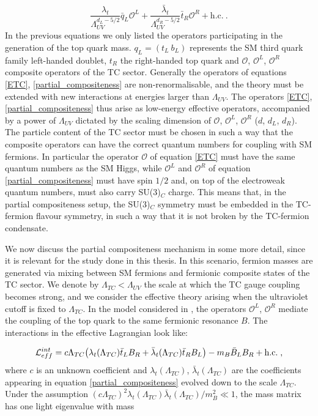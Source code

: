 \begin{equation}
\frac{\lambda_t}{\Lambda_{UV}^{d_L - 5/2}} \bar q_L \mathcal O^L + \frac{\bar \lambda_t}{\Lambda_{UV}^{d_R - 5/2}} \bar t_R  \mathcal O^R + \mathrm{h.c.} \: .
\label{partial_compositeness}
\end{equation}
%
In the previous equations we only listed the operators participating in the generation of the top quark mass. $q_L = (t_L \: b_L)$ represents the SM third quark family left-handed doublet, $t_R$ the right-handed top quark and $\mathcal O$, $\mathcal O^L$, $\mathcal O^R$ composite operators of the TC sector. Generally the operators of equations \ref{ETC}, \ref{partial_compositeness} are non-renormalisable, and the theory must be extended with new interactions at energies larger than $\Lambda_{UV}$. The operators \ref{ETC}, \ref{partial_compositeness} thus arise as low-energy effective operators, accompanied by a power of $\Lambda_{UV}$ dictated by the scaling dimension of $\mathcal O$, $\mathcal O^L$, $\mathcal O^R$ ($d$, $d_L$, $d_R$). The particle content of the TC sector must be chosen in such a way that the composite operators can have the correct quantum numbers for coupling with SM fermions. In particular the operator $\mathcal O$ of equation \ref{ETC} must have the same quantum numbers as the SM Higgs, while $\mathcal O^L$ and $\mathcal O^R$ of equation \ref{partial_compositeness} must have spin $1/2$ and, on top of the electroweak quantum numbers, must also carry SU(3)$_C$ charge. This means that, in the partial compositeness setup, the SU(3)$_C$ symmetry must be embedded in the TC-fermion flavour symmetry, in such a way that it is not broken by the TC-fermion condensate.

We now discuss the partial compositeness mechanism in some more detail, since it is relevant for the study done in this thesis. In this scenario, fermion masses are generated via mixing between SM fermions and fermionic composite states of the TC sector. We denote by $\Lambda_{TC} < \Lambda_{UV} $ the scale at which the TC gauge coupling becomes strong, and we consider the effective theory arising when the ultraviolet cutoff is fixed to $\Lambda_{TC}$. In the model considered in \cite{Kaplan:1991dc}, the operators $\mathcal O^L$, $\mathcal O^R$ mediate the coupling of the top quark to the same fermionic resonance $B$. The interactions in the effective Lagrangian look like:

\begin{equation}
\mathcal L_{eff}^{int} = c \Lambda_{TC}  \bigl( \lambda_t(\Lambda_{TC}) \bar t_L B_R + \bar \lambda_t(\Lambda_{TC}) \bar t_R B_L \bigr) - m_B \bar B_L B_R + \mathrm{h.c.} \; ,
\end{equation}
%
where $c$ is an unknown coefficient and $\lambda_t(\Lambda_{TC})$, $\bar \lambda_t(\Lambda_{TC})$ are the coefficients appearing in equation \ref{partial_compositeness} evolved down to the scale $\Lambda_{TC}$. Under the assumption $(c \Lambda_ {TC})^2  \lambda_t(\Lambda_{TC}) \bar \lambda_t(\Lambda_{TC})/m_B^2 \ll 1$, the mass matrix has one light eigenvalue with mass

